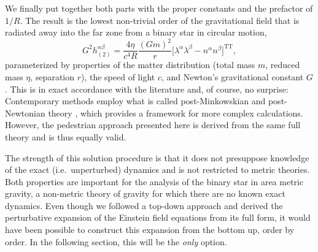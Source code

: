 We finally put together both parts with the proper constants and the prefactor of $1/R$. The result is the lowest non-trivial order of the gravitational field that is radiated away into the far zone from a binary star in circular motion,
\begin{equation}\label{metric_radiation}
  G^2h^{\alpha\beta}_{(2)} = \frac{4\eta}{c^4 R} \frac{(Gm)^2}{r}\lbrack\lambda^\alpha\lambda^\beta - n^\alpha n^\beta\rbrack^\text{TT},
\end{equation}
parameterized by properties of the matter distribution (total mass $m$, reduced mass $\eta$, separation $r$), the speed of light $c$, and Newton's gravitational constant $G$. This is in exact accordance with the literature \cite{poisson2014gravity} and, of course, no surprise: Contemporary methods employ what is called post-Minkowskian and post-Newtonian theory \cite{poisson2014gravity}, which provides a framework for more complex calculations. However, the pedestrian approach presented here is derived from the same full theory and is thus equally valid.

The strength of this solution procedure is that it does not presuppose knowledge of the exact (i.e.~unperturbed) dynamics and is not restricted to metric theories. Both properties are important for the analysis of the binary star in area metric gravity, a non-metric theory of gravity for which there are no known exact dynamics. Even though we followed a top-down approach and derived the perturbative expansion of the Einstein field equations from its full form, it would have been possible to construct this expansion from the bottom up, order by order. In the following section, this will be the \emph{only} option.

